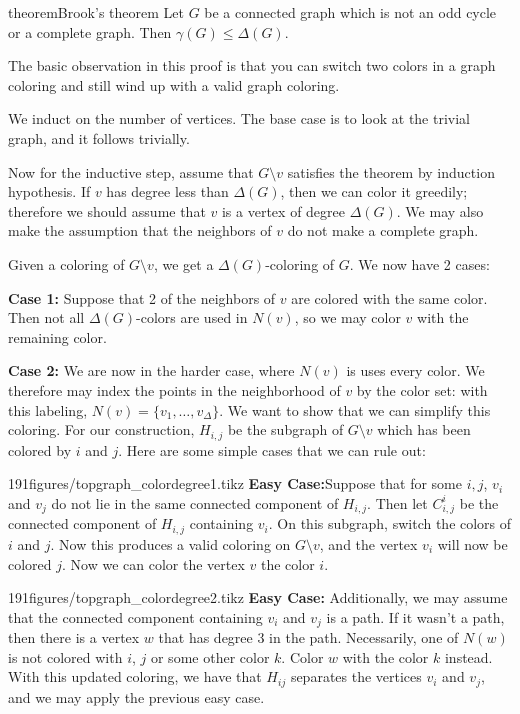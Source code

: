 \begin{doubledpage}{theorem}{Brook's theorem \cite{brooks1941colouring}}{ 
  Let $G$ be a connected graph which is not an odd cycle or a complete graph. Then $\gamma(G)\leq \Delta(G)$. \label{emb:thm:brooks}}


The basic observation in this proof is that you can switch two colors in a graph coloring and still wind up with a valid graph coloring. 

 We induct on the number of vertices. The base case is to look at the trivial graph, and it follows trivially. 

  Now for the inductive step, assume that $G\setminus v$ satisfies the theorem by induction hypothesis. If $v$ has degree less than $\Delta(G)$, then we can color it greedily; therefore we should assume that $v$ is a vertex of degree $\Delta(G)$. We may also make the assumption that the neighbors of $v$ do not make a complete graph. 
  
  Given a coloring of $G\setminus v$, we get a $\Delta(G)$-coloring of $G$. We now have 2 cases:

 \textbf{Case 1:} Suppose that 2 of the neighbors of $v$ are colored with the same color. Then not all $\Delta(G)$-colors are used in $N(v)$, so we may color $v$ with the remaining color. 
 
 \textbf{Case 2:} We are now in the harder case, where $N(v)$ is uses every color. We therefore may index the points in the neighborhood of $v$ by the color set: with this labeling, $N(v)=\{v_1, \ldots, v_\Delta\}$. We want to show that we can simplify this coloring. For our construction,  $H_{i,j}$ be the subgraph of $G\setminus v$ which has been colored by $i$ and $j$. Here are some simple cases that we can rule out: 
 
\begin{paragraphfigureenv}{191figures/topgraph_colordegree1.tikz}
\textbf{Easy Case:}Suppose that for some $i, j$, $v_i$ and $v_j$ do not lie in the same connected component of $H_{i,j}$. Then let $C^i_{i,j}$ be the connected component of $H_{i,j}$ containing $v_i$. On this subgraph, switch the colors of $i$ and $j$. Now this produces a valid coloring on $G\setminus v$, and the vertex $v_i$ will now be colored $j$. Now we can color the vertex $v$ the color $i$.  
\end{paragraphfigureenv}


\begin{paragraphfigureenv}{191figures/topgraph_colordegree2.tikz}
\textbf{Easy Case:} Additionally, we may assume that the connected component containing $v_i$ and $v_j$ is a path. If it wasn't a path, then there is a vertex $w$ that has degree 3 in the path. Necessarily, one of $N(w)$ is not colored with $i$, $j$ or some other color $k$. Color $w$ with the color $k$ instead. With this updated coloring, we have that $H_{ij}$ separates the vertices $v_i$ and $v_j$, and we may apply the previous easy case. 
\end{paragraphfigureenv}



\end{doubledpage}
